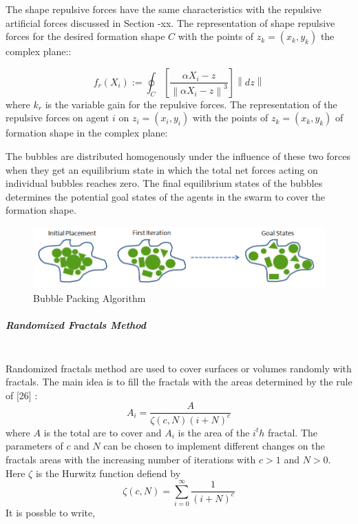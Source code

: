 \documentclass[twoside]{article}
\newcommand{\norm}[1]{\left\lVert#1\right\rVert}
\begin{document}
	
	The shape repulsive forces have the same characteristics with the repulsive artificial forces discussed in Section -xx. The representation of shape repulsive forces for the desired formation shape $C$ with the points of  $z_k = (x_k,y_k)$ the complex plane::
	
		
			\begin{equation}
			f_r(X_i) := \oint_C \left[\frac{\alpha X_i - z}{\norm{\alpha X_i - z}^3}\right] \norm{dz}
			\end{equation}
			where $k_r$ is the variable gain for the repulsive forces. The representation of the repulsive forces on agent $i$ on $z_i = (x_i, y_i)$ with the points of  $z_k = (x_k,y_k)$ of formation shape in the complex plane:
	
	The bubbles are distributed homogenously under the influence of these two forces when they get an equilibrium state in which the total net forces acting on individual bubbles reaches zero. The final equilibrium states of the bubbles determines the potential goal states of the agents in the swarm to cover the formation shape. 
			\begin{figure}[H]
				\caption{Bubble Packing Algorithm}
				\centering
				\includegraphics[scale = 0.70]{bubble_packing2}
			\end{figure}


			\subparagraph{Randomized Fractals Method}\hspace{0pt} \\
Randomized fractals method are used to cover surfaces or volumes randomly with fractals. The main idea is to fill the fractals with the areas determined by the rule of [26] :
\begin{equation}
  A_i = \frac{A}{\zeta(c,N)(i+N)^c}
\end{equation}
	where $A$ is the total are to cover and $A_i$ is the area of the $i^th$ fractal. The parameters of $c$ and $N$ can be chosen to implement different changes on the fractals areas with the increasing number of iterations with $c>1$ and $N>0$. Here  $\zeta$ is the Hurwitz function defiend by
	\begin{equation}
  \zeta(c,N) = \sum_{i=0}^{\infty} \frac{1}{(i+N)^c}
	\end{equation}
	It is possble to write, 
	
\end{document}
